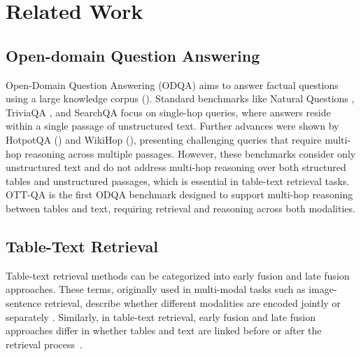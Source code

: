 \vspace{-1mm}
\section{Related Work}
\vspace{-1mm}

\vspace{-1mm}
\subsection{Open-domain Question Answering}
\vspace{-1mm}

Open-Domain Question Answering (ODQA) aims to answer factual questions using a large knowledge corpus (\citealp{zhang-etal-2023-survey-efficient}). Standard benchmarks like Natural Questions \citep{NaturalQuestions}, TriviaQA \citep{TriviaQA}, and SearchQA \citep{SearchQA} focus on single-hop queries, where answers reside within a single passage of unstructured text. 
Further advances were shown by HotpotQA (\citealp{HotpotQA}) and WikiHop (\citealp{WikiHop}), presenting challenging queries that require multi-hop reasoning across multiple passages.
However, these benchmarks consider only unstructured text and do not address multi-hop reasoning over both structured tables and unstructured passages, which is essential in table-text retrieval tasks.
OTT-QA \citep{OTT-QA} is the first ODQA benchmark designed to support multi-hop reasoning between tables and text, requiring retrieval and reasoning across both modalities.


\vspace{-1mm}
\subsection{Table-Text Retrieval}
\vspace{-1mm}

Table-text retrieval methods can be categorized into early fusion and late fusion approaches. These terms, originally used in multi-modal tasks such as image-sentence retrieval, describe whether different modalities are encoded jointly or separately \citep{wang2022comprehensive, snoek2005early, gadzicki2020early}.
Similarly, in table-text retrieval, early fusion and late fusion approaches differ in whether tables and text are linked before or after the retrieval process~\citep{DoTTeR}.

